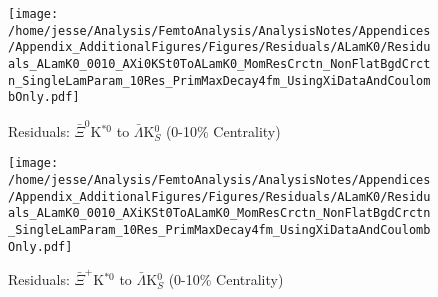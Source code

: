 \documentclass[/home/jesse/Analysis/FemtoAnalysis/AnalysisNotes/AnalysisNoteJBuxton.tex]{subfiles}
\begin{document}
\begin{figure}[h]
  \centering
  \texttt{[image: /home/jesse/Analysis/FemtoAnalysis/AnalysisNotes/Appendices/Appendix\_AdditionalFigures/Figures/Residuals/ALamK0/Residuals\_ALamK0\_0010\_AXi0KSt0ToALamK0\_MomResCrctn\_NonFlatBgdCrctn\_SingleLamParam\_10Res\_PrimMaxDecay4fm\_UsingXiDataAndCoulombOnly.pdf]}
  \caption[Residuals: $\bar{\Xi}^{0}$K$^{*0}$ to $\bar{\Lambda}$K$^{0}_{S}$ (0-10\% Centrality)]{Residuals: $\bar{\Xi}^{0}$K$^{*0}$ to $\bar{\Lambda}$K$^{0}_{S}$ (0-10\% Centrality)}
  \label{fig:Res_ALamK0_0010_AXi0KSt0}
\end{figure}

\begin{figure}[h]
  \centering
  \texttt{[image: /home/jesse/Analysis/FemtoAnalysis/AnalysisNotes/Appendices/Appendix\_AdditionalFigures/Figures/Residuals/ALamK0/Residuals\_ALamK0\_0010\_AXiKSt0ToALamK0\_MomResCrctn\_NonFlatBgdCrctn\_SingleLamParam\_10Res\_PrimMaxDecay4fm\_UsingXiDataAndCoulombOnly.pdf]}
  \caption[Residuals: $\bar{\Xi}^{+}$K$^{*0}$ to $\bar{\Lambda}$K$^{0}_{S}$ (0-10\% Centrality)]{Residuals: $\bar{\Xi}^{+}$K$^{*0}$ to $\bar{\Lambda}$K$^{0}_{S}$ (0-10\% Centrality)}
  \label{fig:Res_ALamK0_0010_AXiCKSt0}
\end{figure}
\end{document}

